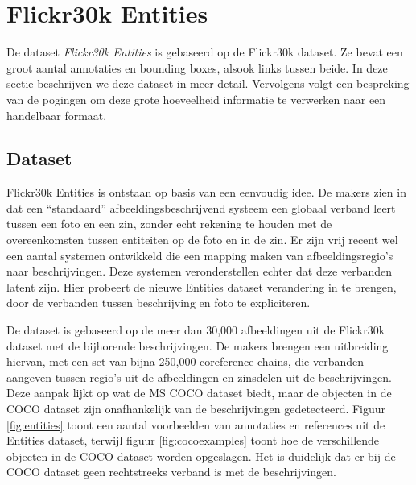 \section{Flickr30k Entities}
De dataset \emph{Flickr30k Entities}\cite{Plummer2015} is gebaseerd op de Flickr30k dataset. Ze bevat een groot aantal annotaties en bounding boxes, alsook links tussen beide. In deze sectie beschrijven we deze dataset in meer detail. Vervolgens volgt een bespreking van de pogingen om deze grote hoeveelheid informatie te verwerken naar een handelbaar formaat. 

\subsection{Dataset}
\label{sub:Dataset}
Flickr30k Entities is ontstaan op basis van een eenvoudig idee. De makers zien in dat een ``standaard'' afbeeldingsbeschrijvend systeem een globaal verband leert tussen een foto en een zin, zonder echt rekening te houden met de overeenkomsten tussen entiteiten op de foto en in de zin. Er zijn vrij recent wel een aantal systemen ontwikkeld die een mapping maken van afbeeldingsregio's naar beschrijvingen. Deze systemen veronderstellen echter dat deze verbanden latent zijn. Hier probeert de nieuwe Entities dataset verandering in te brengen, door de verbanden tussen beschrijving en foto te expliciteren.

De dataset is gebaseerd op de meer dan 30,000 afbeeldingen uit de Flickr30k\cite{Young2014} dataset met de bijhorende beschrijvingen. De makers brengen een uitbreiding hiervan, met een set van bijna 250,000 coreference chains, die verbanden aangeven tussen regio's uit de afbeeldingen en zinsdelen uit de beschrijvingen. Deze aanpak lijkt op wat de MS COCO\cite{Lin2014} dataset biedt, maar de objecten in de COCO dataset zijn onafhankelijk van de beschrijvingen gedetecteerd. Figuur \ref{fig:entities} toont een aantal voorbeelden van annotaties en references uit de Entities dataset, terwijl figuur \ref{fig:cocoexamples} toont hoe de verschillende objecten in de COCO dataset worden opgeslagen. Het is duidelijk dat er bij de COCO dataset geen rechtstreeks verband is met de beschrijvingen. 

